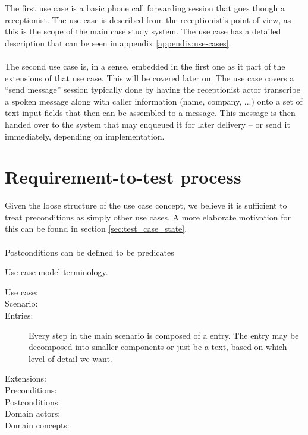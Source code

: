 The first use case is a basic phone call forwarding session that goes though a receptionist. The use case is described from the receptionist's point of view, as this is the scope of the main case study system. The use case has a detailed description that can be seen in appendix \ref{appendix:use-cases}. \\\\
The second use case is, in a sense, embedded in the first one as it part of the extensions of that use case. This will be covered later on. The use case covers a ``send message'' session typically done by having the receptionist actor transcribe a spoken message along with caller information (name, company, ...) onto a set of text input fields that then can be assembled to a message. This message is then handed over to the system that may enqueued it for later delivery -- or send it immediately, depending on implementation.


\section{Requirement-to-test process}
Given the loose structure of the use case concept, we believe it is sufficient to treat preconditions as simply other use cases. A more elaborate motivation for this can be found in section \ref{sec:test_case_state}.\\\\
Postconditions can be defined to be predicates



Use case model terminology.
\begin{description}
  \item[Use case:]
  \item[Scenario:]
  \item[Entries:] Every step in the main scenario is composed of a entry. The entry may be decomposed into smaller components or just be a text, based on which level of detail we want. 
  \item[Extensions:]
  \item[Preconditions:]
  \item[Postconditions:]  
  \item[Domain actors:]
  \item[Domain concepts:]
\end{description}

